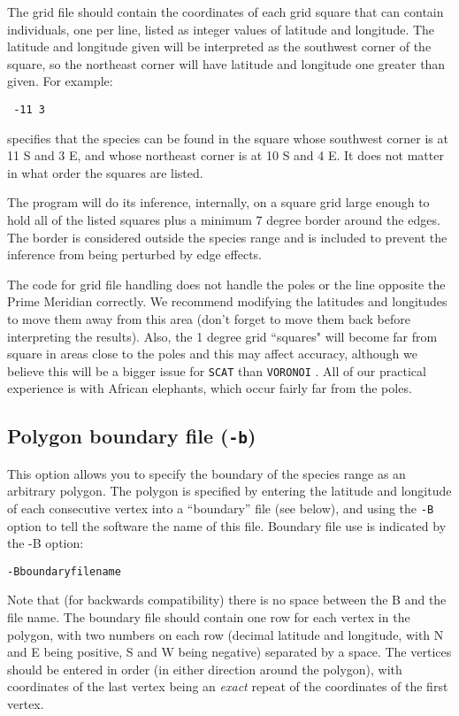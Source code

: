 \documentclass[10pt,titlepage,times,letterpaper]{article}
\def\SCAT{{\tt SCAT} }
\def\VORONOI{{\tt VORONOI} }
\begin{document}
The grid file should contain the coordinates of each grid square that can contain individuals,
one per line, listed as integer values of latitude and longitude. 
The latitude and longitude given will be interpreted as the southwest
corner of the square, so the northeast corner will have latitude and longitude 
one greater than given.  For example:

\medskip

{\noindent
{\tt
-11 3 \\
}}

specifies that the species can be found in the square whose southwest corner is at 11 S and 3 E,
and whose northeast corner is at 10 S and 4 E.  It does not matter in what order the squares are listed.

The program will do its inference, internally, on a square grid large enough to hold all of the
listed squares plus a minimum 7 degree border around the edges.   The border is considered 
outside the species range and is included to prevent the inference from being perturbed by
edge effects.

The code for grid file handling does not handle the poles or the line opposite the Prime 
Meridian 
correctly.  We recommend modifying the latitudes and longitudes to move them away from this 
area (don't forget to move them back before interpreting the results).  Also, the 1 degree 
grid ``squares" will become far from square in areas close to the poles and this may affect 
accuracy, although 
we believe this will be a bigger issue for \SCAT than \VORONOI.  All of our practical 
experience is with African elephants, which occur fairly far from the poles.

\subsection{Polygon boundary file ({\tt -b})}

This option allows you to specify the boundary of the species range as an arbitrary 
polygon.  The polygon is specified by entering the latitude and longitude of
each consecutive vertex into a ``boundary'' file (see below), and using
the {\tt -B} option to tell the software the name of this file.
Boundary file use is indicated by the -B option:

{\tt -Bboundaryfilename}

Note that (for backwards compatibility) there is no space between the B and the file name.
The boundary file should contain one row for each vertex in the
polygon, with two numbers on each row (decimal latitude and longitude,
with N and E being positive, S and W being negative) separated by a
space. The vertices should be entered in order (in either direction
around the polygon), with coordinates of the last vertex being an {\it
exact} repeat of the coordinates of the first vertex.
\end{document}
